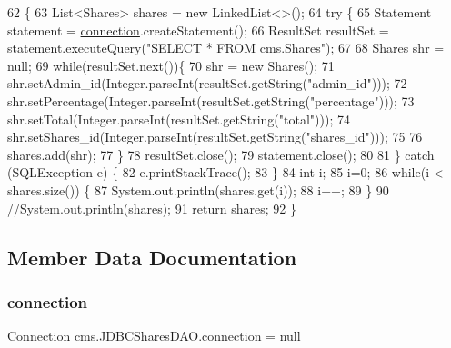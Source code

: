 \begin{DoxyCode}
62                                  \{
63         List<Shares> shares = \textcolor{keyword}{new} LinkedList<>();
64          \textcolor{keywordflow}{try} \{
65                 Statement statement = \mbox{\hyperlink{classcms_1_1_j_d_b_c_shares_d_a_o_a55148864b3f3a771f61d1ac5a2bf841f}{connection}}.createStatement();
66                 ResultSet resultSet = statement.executeQuery(\textcolor{stringliteral}{"SELECT * FROM cms.Shares"});
67                  
68                 Shares shr = null;
69                 \textcolor{keywordflow}{while}(resultSet.next())\{
70                     shr = \textcolor{keyword}{new} Shares();
71                     shr.setAdmin\_id(Integer.parseInt(resultSet.getString(\textcolor{stringliteral}{"admin\_id"})));
72                     shr.setPercentage(Integer.parseInt(resultSet.getString(\textcolor{stringliteral}{"percentage"})));
73                     shr.setTotal(Integer.parseInt(resultSet.getString(\textcolor{stringliteral}{"total"})));
74                     shr.setShares\_id(Integer.parseInt(resultSet.getString(\textcolor{stringliteral}{"shares\_id"})));
75                      
76                     shares.add(shr);
77                 \}
78                 resultSet.close();
79                 statement.close();
80                  
81             \} \textcolor{keywordflow}{catch} (SQLException e) \{
82                 e.printStackTrace();
83             \}
84             \textcolor{keywordtype}{int} i;
85             i=0;
86             \textcolor{keywordflow}{while}(i < shares.size()) \{
87                     System.out.println(shares.get(i));
88                     i++;
89              \}
90             \textcolor{comment}{//System.out.println(shares);}
91             \textcolor{keywordflow}{return} shares;
92     \}
\end{DoxyCode}


\subsection{Member Data Documentation}
\mbox{\label{classcms_1_1_j_d_b_c_shares_d_a_o_a55148864b3f3a771f61d1ac5a2bf841f}} 
\subsubsection{\texorpdfstring{connection}{connection}}
{\footnotesize\ttfamily Connection cms.\+J\+D\+B\+C\+Shares\+D\+A\+O.\+connection = null\hspace{0.3cm}{\ttfamily [package]}}

